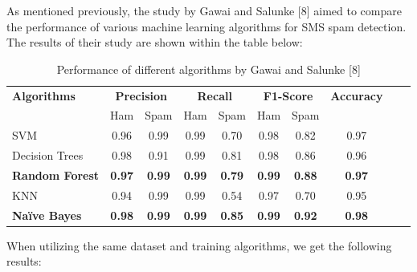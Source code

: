 \documentclass{article}
\begin{document}
\noindent
As mentioned previously, the study by Gawai and Salunke [8] aimed to compare the performance of various machine learning algorithms for SMS spam detection. The results of their study are shown within the table below:

\begin{table}[htbp]
    \centering
    \caption{Performance of different algorithms by Gawai and Salunke [8]} %
    \label{tab:performance} %
    
    \begin{tabular}{l cccc cccc c}
    \toprule
    \textbf{Algorithms} & \multicolumn{2}{c}{\textbf{Precision}} & \multicolumn{2}{c}{\textbf{Recall}} & \multicolumn{2}{c}{\textbf{F1-Score}} & \textbf{Accuracy} \\
    \cmidrule(lr){2-3} \cmidrule(lr){4-5} \cmidrule(lr){6-7}
    & Ham & Spam & Ham & Spam & Ham & Spam & \\
    \midrule
    SVM & 0.96 & 0.99 & 0.99 & 0.70 & 0.98 & 0.82 & 0.97 \\
    Decision Trees & 0.98 & 0.91 & 0.99 & 0.81 & 0.98 & 0.86 & 0.96 \\
    \textbf{Random Forest} & \textbf{0.97} & \textbf{0.99} & \textbf{0.99} & \textbf{0.79} & \textbf{0.99} & \textbf{0.88} & \textbf{0.97} \\
    KNN & 0.94 & 0.99 & 0.99 & 0.54 & 0.97 & 0.70 & 0.95 \\
    \textbf{Naïve Bayes} & \textbf{0.98} & \textbf{0.99} & \textbf{0.99} & \textbf{0.85} & \textbf{0.99} & \textbf{0.92} & \textbf{0.98} \\
    \bottomrule
    \end{tabular}
\end{table}

\noindent
When utilizing the same dataset and training algorithms, we get the following results:
\end{document}
